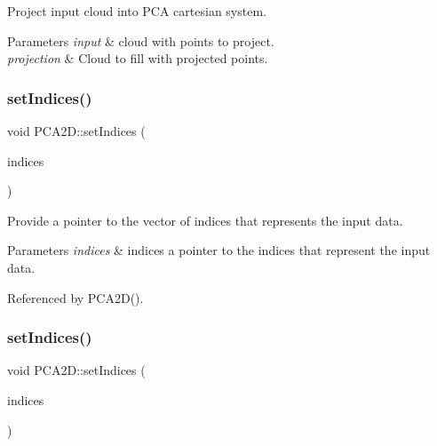 Project input cloud into P\+CA cartesian system. 


\begin{DoxyParams}{Parameters}
{\em input} & cloud with points to project. \\
\hline
{\em projection} & Cloud to fill with projected points. \\
\hline
\end{DoxyParams}
\mbox{\label{classPCA2D_af6c41fea17b2a9debbef5c88dc963f1e}} 
\subsubsection{\texorpdfstring{set\+Indices()}{setIndices()}\hspace{0.1cm}{\footnotesize\ttfamily [1/5]}}
{\footnotesize\ttfamily void P\+C\+A2\+D\+::set\+Indices (\begin{DoxyParamCaption}\item[{const pcl\+::\+Point\+Indices \&}]{indices }\end{DoxyParamCaption})}



Provide a pointer to the vector of indices that represents the input data. 


\begin{DoxyParams}{Parameters}
{\em indices} & indices a pointer to the indices that represent the input data. \\
\hline
\end{DoxyParams}


Referenced by P\+C\+A2\+D().

\mbox{\label{classPCA2D_a0b214db07c98537f683bb69a7e9d9271}} 
\subsubsection{\texorpdfstring{set\+Indices()}{setIndices()}\hspace{0.1cm}{\footnotesize\ttfamily [2/5]}}
{\footnotesize\ttfamily void P\+C\+A2\+D\+::set\+Indices (\begin{DoxyParamCaption}\item[{const pcl\+::\+Point\+Indices\+Ptr \&}]{indices }\end{DoxyParamCaption})}



